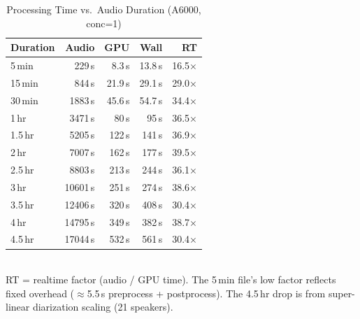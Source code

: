 \documentclass[conference,10pt]{IEEEtran}
\begin{document}
\begin{table}[!t]
\centering
\caption{Processing Time vs.\ Audio Duration (A6000, conc=1)}
\label{tab:duration}
\begin{tabular}{@{}lrrrr@{}}
\toprule
\textbf{Duration} & \textbf{Audio} & \textbf{GPU} & \textbf{Wall} & \textbf{RT} \\
\midrule
5\,min   &    229\,s &   8.3\,s &  13.8\,s & 16.5$\times$ \\
15\,min  &    844\,s &  21.9\,s &  29.1\,s & 29.0$\times$ \\
30\,min  &  \num{1883}\,s &  45.6\,s &  54.7\,s & 34.4$\times$ \\
1\,hr    &  \num{3471}\,s &  80\,s   &  95\,s   & 36.5$\times$ \\
1.5\,hr  &  \num{5205}\,s & 122\,s   & 141\,s   & 36.9$\times$ \\
2\,hr    &  \num{7007}\,s & 162\,s   & 177\,s   & 39.5$\times$ \\
2.5\,hr  &  \num{8803}\,s & 213\,s   & 244\,s   & 36.1$\times$ \\
3\,hr    & \num{10601}\,s & 251\,s   & 274\,s   & 38.6$\times$ \\
3.5\,hr  & \num{12406}\,s & 320\,s   & 408\,s   & 30.4$\times$ \\
4\,hr    & \num{14795}\,s & 349\,s   & 382\,s   & 38.7$\times$ \\
4.5\,hr  & \num{17044}\,s & 532\,s   & 561\,s   & 30.4$\times$ \\
\bottomrule
\end{tabular}
\\[4pt]
{\footnotesize RT = realtime factor (audio / GPU time). The 5\,min file's low
  factor reflects fixed overhead ($\approx$5.5\,s preprocess + postprocess).
  The 4.5\,hr drop is from super-linear diarization scaling (21 speakers).}
\end{table}
\end{document}
